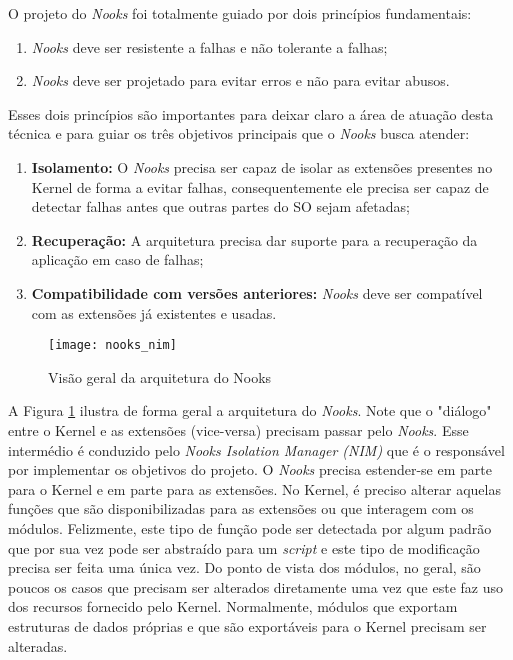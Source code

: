 O projeto do \emph{Nooks} foi totalmente guiado por dois princípios
fundamentais:

\begin{enumerate}
	\item \emph{Nooks} deve ser resistente a falhas e não tolerante a falhas;
	\item \emph{Nooks} deve ser projetado para evitar erros e não para evitar
				abusos.
\end{enumerate}

Esses dois princípios são importantes para deixar claro a área de atuação desta
técnica e para guiar os três objetivos principais que o \emph{Nooks} busca
atender:

\begin{enumerate}
	\item \textbf{Isolamento:} O \emph{Nooks} precisa ser capaz de isolar as
				extensões presentes no Kernel de forma a evitar falhas, consequentemente
				ele precisa ser capaz de detectar falhas antes que outras partes do
				SO sejam afetadas;
	\item \textbf{Recuperação:} A arquitetura precisa dar suporte para a
				recuperação da aplicação em caso de falhas;
	\item \textbf{Compatibilidade com versões anteriores:} \emph{Nooks} deve ser
				compatível com as extensões já existentes e usadas.
\end{enumerate}

\begin{figure}[!h]
  \centering
  \texttt{[image: nooks\_nim]}
  \caption{Visão geral da arquitetura do Nooks \citep{nooks}}
  \label{fig:nooks_nim}
\end{figure}

A Figura \ref{fig:nooks_nim} ilustra de forma geral a arquitetura do
\emph{Nooks}. Note que o "diálogo" entre o Kernel e as extensões (vice-versa)
precisam passar pelo \emph{Nooks}. Esse intermédio é conduzido pelo \emph{Nooks
Isolation Manager (NIM)} que é o responsável por implementar os objetivos do
projeto. O \emph{Nooks} precisa estender-se em parte para o Kernel e em parte
para as extensões. No Kernel, é preciso alterar aquelas funções que são
disponibilizadas para as extensões ou que interagem com os módulos. Felizmente,
este tipo de função pode ser detectada por algum padrão que por sua vez pode
ser abstraído para um \emph{script} e este tipo de modificação precisa ser
feita uma única vez. Do ponto de vista dos módulos, no geral, são poucos os
casos que precisam ser alterados diretamente uma vez que este faz uso dos
recursos fornecido pelo Kernel. Normalmente, módulos que exportam estruturas de
dados próprias e que são exportáveis para o Kernel precisam ser alteradas.

